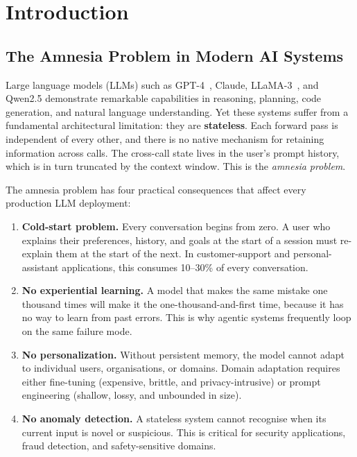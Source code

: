 \documentclass[12pt,a4paper]{article}
\theoremstyle{definition}
\theoremstyle{remark}
\begin{document}
\newpage
\tableofcontents
\newpage

\section{Introduction}
\label{sec:intro}

\subsection{The Amnesia Problem in Modern AI Systems}

Large language models (LLMs) such as GPT-4~\cite{brown2020}, Claude, LLaMA-3~\cite{touvron2023}, and Qwen2.5 demonstrate remarkable capabilities in reasoning, planning, code generation, and natural language understanding. Yet these systems suffer from a fundamental architectural limitation: they are \textbf{stateless}. Each forward pass is independent of every other, and there is no native mechanism for retaining information across calls. The cross-call state lives in the user's prompt history, which is in turn truncated by the context window. This is the \textit{amnesia problem}.

The amnesia problem has four practical consequences that affect every production LLM deployment:

\begin{enumerate}[leftmargin=2cm]
    \item \textbf{Cold-start problem.} Every conversation begins from zero. A user who explains their preferences, history, and goals at the start of a session must re-explain them at the start of the next. In customer-support and personal-assistant applications, this consumes 10--30\% of every conversation.
    \item \textbf{No experiential learning.} A model that makes the same mistake one thousand times will make it the one-thousand-and-first time, because it has no way to learn from past errors. This is why agentic systems frequently loop on the same failure mode.
    \item \textbf{No personalization.} Without persistent memory, the model cannot adapt to individual users, organisations, or domains. Domain adaptation requires either fine-tuning (expensive, brittle, and privacy-intrusive) or prompt engineering (shallow, lossy, and unbounded in size).
    \item \textbf{No anomaly detection.} A stateless system cannot recognise when its current input is novel or suspicious. This is critical for security applications, fraud detection, and safety-sensitive domains.
\end{enumerate}
\end{document}
